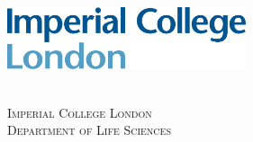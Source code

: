 
\begin{titlepage} %
    
    \includegraphics[width=7cm]{Figures/collegeLogo.png} %
     
    
    \center %
    
    \vspace{1cm}
    \quad\\[1cm]
    \textsc{\Large Imperial College London}\\[0.5cm] %
    \textsc{\Large Department of Life Sciences}\\[0.5cm]
  
     
    \vspace{1cm}
    \makeatletter
    \HRule \\[0.4cm]
    { \huge \bfseries \@title}\\[0.4cm] %
    \HRule \\[1cm]
     

\end{titlepage}

